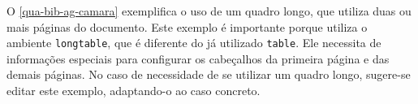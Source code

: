 O \autoref{qua-bib-ag-camara} exemplifica o uso de um quadro longo, que utiliza duas ou mais páginas do documento. Este exemplo é importante porque utiliza o ambiente \verb|longtable|, que é diferente do já utilizado \verb|table|. Ele necessita de informações especiais para configurar os cabeçalhos da primeira página e das demais páginas. No caso de necessidade de se utilizar um quadro longo, sugere-se editar este exemplo, adaptando-o ao caso concreto.

 \begin{quadro}[htbp]
  \centering
  \captionsetup{width=1.\textwidth} %
  \caption{Descrição de artigos, monografias, dissertações e teses sobre a Agência Câmara}
  \label{qua-bib-ag-camara}  
\end{quadro}
\vspace{-12mm}
           
\begingroup
\footnotesize
\setlength{\tabcolsep}{3pt} %

